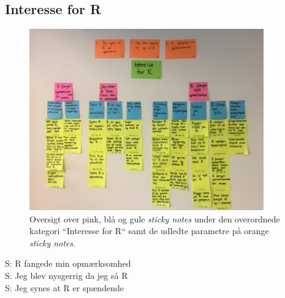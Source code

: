 \subsection{Interesse for R}
%
\begin{figure}[H]
\centering
\includegraphics[width = 0.9\textwidth]{Figure/AffinityDiagram/InteresseForR} 
\caption{Oversigt over pink, blå og gule \textit{sticky notes} under den overordnede kategori ``Interesse for R`` samt de udledte parametre på orange \textit{sticky notes}.}
\label{fig:AFInteresseForR}
\end{figure}
\noindent
%
S: R fangede min opmærksomhed\\
S: Jeg blev nysgerrig da jeg så R\\
S: Jeg synes at R er spændende

